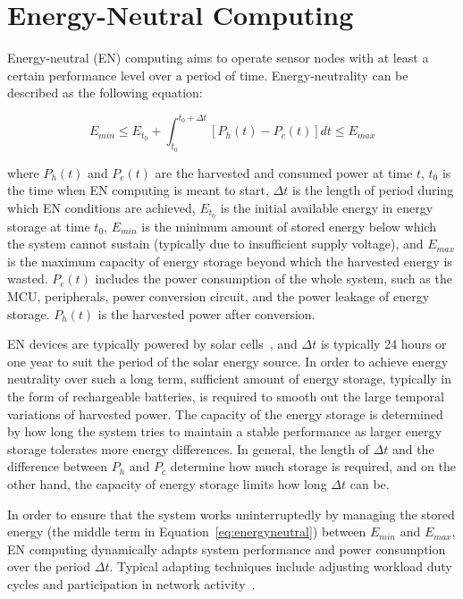 \section{Energy-Neutral Computing} \label{sec:en}

Energy-neutral (EN) computing aims to operate sensor nodes with at least a certain performance level over a period of time. Energy-neutrality can be described as the following equation:

\begin{equation} \label{eq:energyneutral}
    E_{min} \leq E_{t_0} + \int_{t_0}^{t_0+\Delta t} [P_h(t) - P_c(t)] dt \leq E_{max}
\end{equation} 

where $P_h(t)$ and $P_c(t)$ are the harvested and consumed power at time $t$, $t_0$ is the time when EN computing is meant to start, $\Delta t$ is the length of period during which EN conditions are achieved, $E_{t_0}$ is the initial available energy in energy storage at time $t_0$, $E_{min}$ is the minimum amount of stored energy below which the system cannot sustain (typically due to insufficient supply voltage), and $E_{max}$ is the maximum capacity of energy storage beyond which the harvested energy is wasted. $P_c(t)$ includes the power consumption of the whole system, such as the MCU, peripherals, power conversion circuit, and the power leakage of energy storage. $P_h(t)$ is the harvested power after conversion. 

EN devices are typically powered by solar cells~\cite{escolar2014energy}, and $\Delta t$ is typically 24 hours or one year to suit the period of the solar energy source. In order to achieve energy neutrality over such a long term, sufficient amount of energy storage, typically in the form of rechargeable batteries, is required to smooth out the large temporal variations of harvested power. The capacity of the energy storage is determined by how long the system tries to maintain a stable performance as larger energy storage tolerates more energy differences. In general, the length of $\Delta t$ and the difference between $P_h$ and $P_c$ determine how much storage is required, and on the other hand, the capacity of energy storage limits how long $\Delta t$ can be.

In order to ensure that the system works uninterruptedly by managing the stored energy (the middle term in Equation~\ref{eq:energyneutral}) between $E_{min}$ and $E_{max}$, EN computing dynamically adapts system performance and power consumption over the period $\Delta t$. Typical adapting techniques include adjusting workload duty cycles and participation in network activity~\cite{merrett2017energy}.

